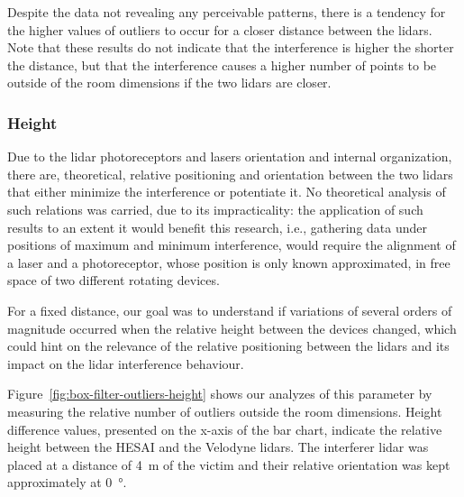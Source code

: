 Despite the data not revealing any perceivable patterns, there is a tendency for the higher values of outliers to occur for a closer distance between the \acp{lidar}. Note that these results do not indicate that the interference is higher the shorter the distance, but that the interference causes a higher number of points to be outside of the room dimensions if the two \acp{lidar} are closer. 

\subsubsection{Height}
Due to the \ac{lidar} photoreceptors and lasers orientation and internal organization, there are, theoretical, relative positioning and orientation between the two \acp{lidar} that either minimize the interference or potentiate it. No theoretical analysis of such relations was carried, due to its impracticality: the application of such results to an extent it would benefit this research, i.e., gathering data under positions of maximum and minimum interference,  would require the alignment of a laser and a photoreceptor, whose position is only known approximated, in free space of two different rotating devices.

For a fixed distance, our goal was to understand if variations of several orders of magnitude occurred when the relative height between the devices changed, which could hint on the relevance of the relative positioning between the \acp{lidar} and its impact on the \ac{lidar} interference behaviour.

Figure~\ref{fig:box-filter-outliers-height} shows our analyzes of this parameter by measuring the relative number of outliers outside the room dimensions. Height difference values, presented on the x-axis of the bar chart, indicate the relative height between the HESAI and the Velodyne \acp{lidar}. The interferer \ac{lidar} was placed at a distance of \SI{4}{\meter} of the victim and their relative orientation was kept approximately at \SI{0}{\degree}.

